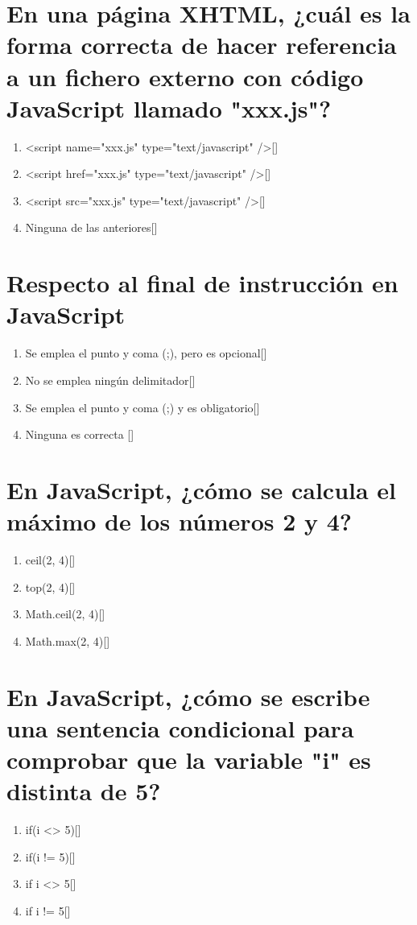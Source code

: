 \documentclass[addpoints, 12]{exam}{article}
\begin{document}
\section{En una página XHTML, ¿cuál es la forma correcta de hacer referencia a un fichero externo con código JavaScript llamado "xxx.js"?}
\label{sec:org4d92629}
\begin{enumerate}
\item <script name="xxx.js" type="text/javascript" />[]
\item <script href="xxx.js" type="text/javascript" />[]
\item <script src="xxx.js" type="text/javascript" />[]
\item Ninguna de las anteriores[]
\end{enumerate}

\section{Respecto al final de instrucción en JavaScript}
\label{sec:org35348eb}
\begin{enumerate}
\item Se emplea el punto y coma (;), pero es opcional[]
\item No se emplea ningún delimitador[]
\item Se emplea el punto y coma (;) y es obligatorio[]
\item Ninguna es correcta []
\end{enumerate}

\section{En JavaScript, ¿cómo se calcula el máximo de los números 2 y 4?}
\label{sec:org5330dd3}
\begin{enumerate}
\item ceil(2, 4)[]
\item top(2, 4)[]
\item Math.ceil(2, 4)[]
\item Math.max(2, 4)[]
\end{enumerate}

\section{En JavaScript, ¿cómo se escribe una sentencia condicional para comprobar que la variable "i" es distinta de 5?}
\label{sec:orgeab95b9}
\begin{enumerate}
\item if(i <> 5)[]
\item if(i != 5)[]
\item if i <> 5[]
\item if i != 5[]
\end{enumerate}
\end{document}
